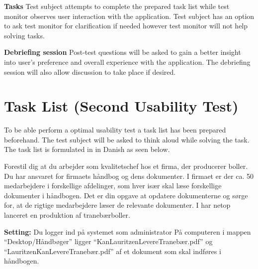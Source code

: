\textbf{Tasks}
Test subject attempts to complete the prepared task list while test monitor observes user interaction with the application.
Test subject has an option to ask test monitor for clarification if needed however test monitor will not help solving tasks.

\textbf{Debriefing session}
Post-test questions will be asked to gain a better insight into user's preference and overall experience with the application.
The debriefing session will also allow discussion to take place if desired.

\section{Task List (Second Usability Test)} \label{sec:utest2tasklist}
To be able perform a optimal usability test a task list has been prepared beforehand.
The test subject will be asked to think aloud while solving the task.
The task list is formulated in in Danish as seen below.

Forestil dig at du arbejder som kvalitetschef hos et firma, der producerer boller.
Du har ansvaret for firmaets håndbog og dens dokumenter.
I firmaet er der ca. 50 medarbejdere i forskellige afdelinger, som hver især skal læse forskellige dokumenter i håndbogen.
Det er din opgave at opdatere dokumenterne og sørge for, at de rigtige medarbejdere læser de relevante dokumenter.
I har netop lanceret en produktion af tranebærboller.

\textbf{Setting:}
Du logger ind på systemet som administrator
På computeren i mappen “Desktop/Håndbøger” ligger “KanLauritzenLevereTranebær.pdf”  og “LauritzenKanLevereTranebær.pdf” af et dokument som skal indføres i håndbogen.

